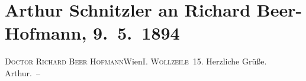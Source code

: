 

         
         \renewcommand{\erwaehntePersonen}{Personen: Richard Beer-Hofmann}
         \renewcommand{\erwaehnteOrte}{Orte: IX., Alsergrund, Wien, Wollzeile}
         \renewcommand{\erwaehnteWerke}{}
               \section[Arthur Schnitzler an Richard Beer-Hofmann, 9. 5. 1894]{ Arthur Schnitzler an Richard Beer-Hofmann, 9. 5. 1894}\nopagebreak{}\rehead{ }\begin{ledgroupsized}[t]{13cm}\normalsize\beginnumbering \toendnotes[C]{\smallbreak\pagebreak[2]} 
\pstart{}{\pb}\textsc{Doctor Richard Beer Hofmann}\pend{}\pstart{}Wien\pend{}\pstart{}\textsc{I. Wollzeile 15}.\pend{}{\bigskip}\pstart
           \noindent{}{\pb}Herzliche Grüße.\pend
           \pstart
           \spacefill\mbox{Arthur. –}\pend
           
         
         \endnumbering{}\end{ledgroupsized}  \newcommand{\dateiname}{L00322}\newcommand{\titel}{Arthur Schnitzler an Richard Beer-Hofmann, 9. 5. 1894}\newcommand{\editorInnen}{Martin Anton Müller und Gerd-Hermann Susen}
      